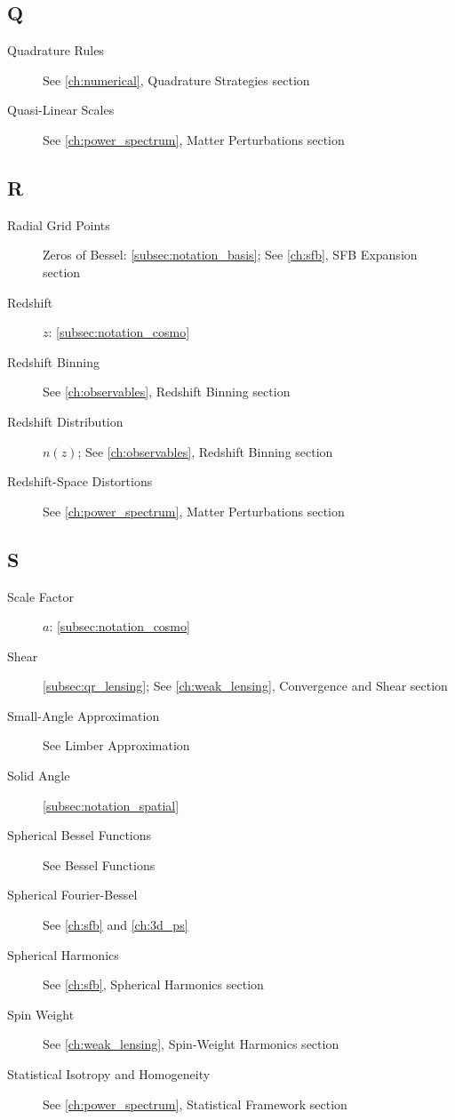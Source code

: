 \subsection{Q}\label{subsec:idx_q}

\begin{description}
    \item[Quadrature Rules] See \cref{ch:numerical}, Quadrature Strategies section
    \item[Quasi-Linear Scales] See \cref{ch:power_spectrum}, Matter Perturbations section
\end{description}

\subsection{R}\label{subsec:idx_r}

\begin{description}
    \item[Radial Grid Points] Zeros of Bessel: \autoref{subsec:notation_basis}; See \cref{ch:sfb}, SFB Expansion section
    \item[Redshift] $z$: \autoref{subsec:notation_cosmo}
    \item[Redshift Binning] See \cref{ch:observables}, Redshift Binning section
    \item[Redshift Distribution] $n(z)$; See \cref{ch:observables}, Redshift Binning section
    \item[Redshift-Space Distortions] See \cref{ch:power_spectrum}, Matter Perturbations section
\end{description}

\subsection{S}\label{subsec:idx_s}

\begin{description}
    \item[Scale Factor] $a$: \autoref{subsec:notation_cosmo}
    \item[Shear] \autoref{subsec:qr_lensing}; See \cref{ch:weak_lensing}, Convergence and Shear section
    \item[Small-Angle Approximation] See Limber Approximation
    \item[Solid Angle] \autoref{subsec:notation_spatial}
    \item[Spherical Bessel Functions] See Bessel Functions
    \item[Spherical Fourier-Bessel] See \cref{ch:sfb} and \cref{ch:3d_ps}
    \item[Spherical Harmonics] See \cref{ch:sfb}, Spherical Harmonics section
    \item[Spin Weight] See \cref{ch:weak_lensing}, Spin-Weight Harmonics section
    \item[Statistical Isotropy and Homogeneity] See \cref{ch:power_spectrum}, Statistical Framework section
\end{description}

